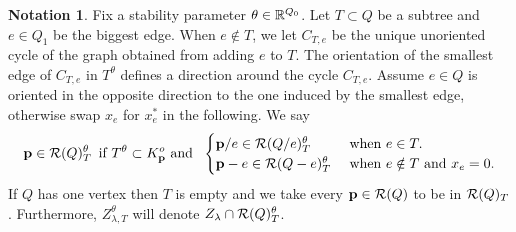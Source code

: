 \documentclass{amsart}
\theoremstyle{definition}
\newtheorem{notn}[thm]{Notation}
\begin{document}
\begin{notn}\label{notn:intree}
Fix a stability parameter $\theta \in \mathbb{R}^{Q_0}$. 
Let $T \subset Q$ be a subtree and $e\in Q_1$ be the biggest edge. 
When $e \notin T$, we let $C_{T,e}$ be the unique unoriented cycle of the graph obtained from adding $e$ to $T$.
The orientation of the smallest edge of $C_{T,e}$ in $T^\theta$ defines a direction around the cycle $C_{T,e}$.
Assume $e \in Q$ is oriented in the opposite direction to the one induced by the smallest edge, otherwise swap $x_e$ for $x_e^*$ in the following.
We say 
$$\mathbf{p} \in \mathcal{R}(Q)_T^\theta \,\text{ if } T^\theta \subset K_{\mathbf{p}}^o \text{ and } \,\,\begin{cases} \mathbf{p}/e \in \mathcal{R}(Q/e)_T^\theta & \text{ when } e \in T. \\ \mathbf{p}-e \in \mathcal{R}(Q-e)_T^\theta & \text{ when } e \notin T \text{ and } x_e =0.\end{cases}$$
If $Q$ has one vertex then $T$ is empty and we take every $\mathbf{p} \in \mathcal{R}(Q)$ to be in $\mathcal{R}(Q)_T$.
Furthermore, $Z_{\lambda,T}^\theta$ will denote $Z_{\lambda} \cap \mathcal{R}(Q)_T^\theta$.
\end{notn}
\end{document}

